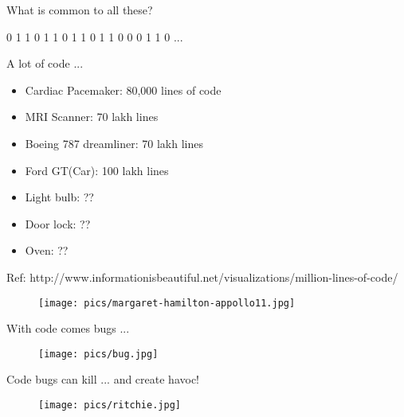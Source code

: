 \documentclass{beamer}
\begin{document}
\begin{frame}{}

\begin{block}{}
What is common to all these?
\end{block}

\end{frame}
\begin{frame}{}

\begin{block}{}
0 1 1 0 1 1 0 1 1 0 1 1 0 0 0 1 1 0 ...
\end{block}

\end{frame}
\begin{frame}{A lot of code ...}

\begin{itemize}
\item Cardiac Pacemaker: 80,000 lines of code
\item MRI Scanner: 70 lakh lines
\item Boeing 787 dreamliner: 70 lakh lines
\item Ford GT(Car): 100 lakh lines
\item Light bulb: ??
\item Door lock: ??
\item Oven: ??
\end{itemize}

Ref: http://www.informationisbeautiful.net/visualizations/million-lines-of-code/
\end{frame}
\begin{frame}{}

\begin{figure}
\texttt{[image: pics/margaret-hamilton-appollo11.jpg]}
\end{figure}

\end{frame}
\begin{frame}{With code comes bugs ...}

\begin{figure}
\texttt{[image: pics/bug.jpg]}
\end{figure}

Code bugs can kill ... and create havoc!

\end{frame}
\begin{frame}{}

\begin{figure}
\texttt{[image: pics/ritchie.jpg]}
\end{figure}

\end{frame}
\end{document}

